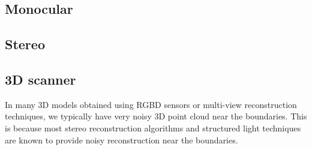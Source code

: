 \subsection{Monocular}
	
\subsection{Stereo}


\subsection{3D scanner}
In many 3D models obtained using RGBD sensors or multi-view reconstruction techniques, we typically have very noisy 3D point cloud near the boundaries. This is because most stereo reconstruction algorithms and structured light techniques are known to provide noisy reconstruction near the boundaries.

~\cite{Authors06}

